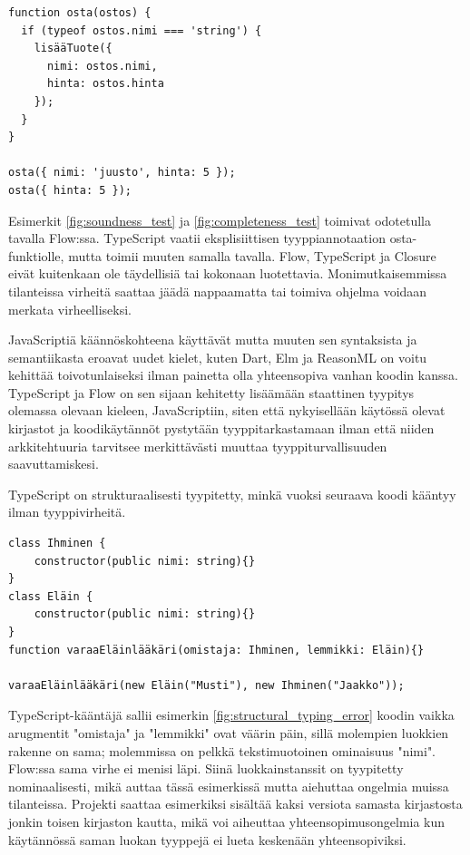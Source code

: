 \begin{minipage}{\linewidth}
\begin{lstlisting}[caption={Toimiva JavaScript-ohjelma: Virheelliseltä kutsulta on suojauduttu tarkistuksella.},label={fig:completeness_test}]
function osta(ostos) {
  if (typeof ostos.nimi === 'string') {
    lisääTuote({
      nimi: ostos.nimi,
      hinta: ostos.hinta
    });
  }
}

osta({ nimi: 'juusto', hinta: 5 });
osta({ hinta: 5 });
\end{lstlisting}
\end{minipage}
Esimerkit \ref{fig:soundness_test} ja \ref{fig:completeness_test} toimivat
odotetulla tavalla Flow:ssa. TypeScript vaatii eksplisiittisen tyyppiannotaation
osta-funktiolle, mutta toimii muuten samalla tavalla. Flow, TypeScript ja
Closure eivät kuitenkaan ole täydellisiä tai kokonaan luotettavia.
Monimutkaisemmissa tilanteissa virheitä saattaa jäädä nappaamatta tai toimiva
ohjelma voidaan merkata virheelliseksi.

JavaScriptiä käännöskohteena käyttävät
mutta muuten sen syntaksista ja semantiikasta eroavat uudet kielet,
kuten Dart, Elm ja ReasonML on voitu kehittää toivotunlaiseksi ilman painetta olla
yhteensopiva vanhan koodin kanssa. TypeScript ja Flow on sen sijaan kehitetty
lisäämään staattinen tyypitys olemassa olevaan kieleen, JavaScriptiin,
siten että nykyisellään käytössä olevat kirjastot ja koodikäytännöt pystytään
tyyppitarkastamaan ilman että niiden arkkitehtuuria tarvitsee merkittävästi
muuttaa tyyppiturvallisuuden saavuttamiskesi.

TypeScript on strukturaalisesti tyypitetty, minkä vuoksi seuraava koodi kääntyy
ilman tyyppivirheitä.

\begin{minipage}{\linewidth}
\begin{lstlisting}[caption={Loogisen virheen sisältävä, mutta ilman virheitä kääntyvä TypeScript-ohjelma.}]
class Ihminen {
    constructor(public nimi: string){}
}
class Eläin {
    constructor(public nimi: string){}
}
function varaaEläinlääkäri(omistaja: Ihminen, lemmikki: Eläin){}

varaaEläinlääkäri(new Eläin("Musti"), new Ihminen("Jaakko"));
\end{lstlisting}
\label{fig:structural_typing_error}
\end{minipage}
TypeScript-kääntäjä sallii esimerkin \ref{fig:structural_typing_error} koodin
vaikka arugmentit "omistaja" ja "lemmikki" ovat väärin päin, sillä
molempien luokkien rakenne on sama; molemmissa on pelkkä tekstimuotoinen
ominaisuus "nimi". Flow:ssa sama virhe ei menisi läpi. Siinä luokkainstanssit
on tyypitetty nominaalisesti, mikä auttaa tässä esimerkissä mutta aiehuttaa ongelmia
muissa tilanteissa. Projekti saattaa esimerkiksi sisältää kaksi versiota samasta
kirjastosta jonkin toisen kirjaston kautta, mikä voi aiheuttaa yhteensopimusongelmia
kun käytännössä saman luokan tyyppejä ei lueta keskenään yhteensopiviksi. 